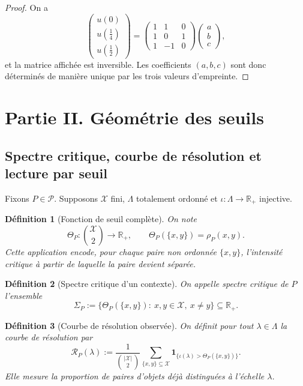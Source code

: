 \documentclass[11pt,a4paper]{article}
\newtheorem{definition}{Définition}
\begin{document}
\begin{proof}
On a
\[
\begin{pmatrix}
u(0)\\[0.2em]
u\!\left(\tfrac14\right)\\[0.2em]
u\!\left(\tfrac12\right)
\end{pmatrix}
=
\begin{pmatrix}
1&1&0\\
1&0&1\\
1&-1&0
\end{pmatrix}
\begin{pmatrix}
a\\b\\c
\end{pmatrix},
\]
et la matrice affichée est inversible. Les coefficients \((a,b,c)\) sont donc déterminés de manière unique par les trois valeurs d'empreinte.
\end{proof}

\section{Partie II. Géométrie des seuils}

\subsection{Spectre critique, courbe de résolution et lecture par seuil}

Fixons \(P\in\mathcal P\). Supposons \(\mathcal X\) fini, \(\Lambda\) totalement ordonné et \(\iota:\Lambda\to\mathbb R_+\) injective.

\begin{definition}[Fonction de seuil complète]
On note
\[
\Theta_P:\binom{\mathcal X}{2}\longrightarrow \mathbb R_+,
\qquad
\Theta_P(\{x,y\})=\rho_P(x,y).
\]
Cette application encode, pour chaque paire non ordonnée \(\{x,y\}\), l'intensité critique à partir de laquelle la paire devient séparée.
\end{definition}

\begin{definition}[Spectre critique d'un contexte]
On appelle \emph{spectre critique} de \(P\) l'ensemble
\[
\Sigma_P:=\{\Theta_P(\{x,y\}):\ x,y\in\mathcal X,\ x\neq y\}\subseteq \mathbb R_+.
\]
\end{definition}

\begin{definition}[Courbe de résolution observée]
On définit pour tout \(\lambda\in\Lambda\) la courbe de résolution par
\[
\mathcal R_P(\lambda)
:=
\frac{1}{\binom{|\mathcal X|}{2}}
\sum_{\{x,y\}\subseteq\mathcal X}
\mathbf 1_{\{\iota(\lambda)>\Theta_P(\{x,y\})\}}.
\]
Elle mesure la proportion de paires d'objets déjà distinguées à l'échelle \(\lambda\).
\end{definition}
\end{document}
